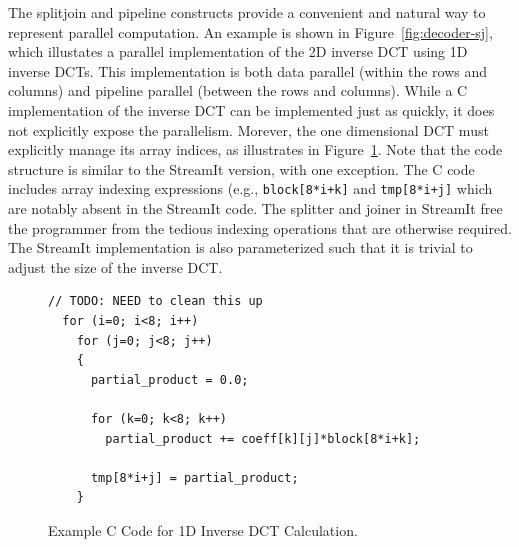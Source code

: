 The splitjoin and pipeline constructs provide a convenient and natural
way to represent parallel computation. An example is shown in
Figure~\ref{fig:decoder-sj}, which illustates a parallel
implementation of the 2D inverse DCT using 1D inverse DCTs. This
implementation is both data parallel (within the rows and columns) and
pipeline parallel (between the rows and columns). While a C
implementation of the inverse DCT can be implemented just as quickly,
it does not explicitly expose the parallelism. Morever, the one
dimensional DCT must explicitly manage its array indices, as
illustrates in Figure~\ref{fig:idct_creference}. Note that the code
structure is similar to the StreamIt version, with one exception. The
C code includes array indexing expressions (e.g.,
\texttt{block[8*i+k]} and \texttt{tmp[8*i+j]} which are notably absent
in the StreamIt code. The splitter and joiner in StreamIt free the
programmer from the tedious indexing operations that are otherwise
required. The StreamIt implementation is also parameterized such that
it is trivial to adjust the size of the inverse DCT.

\begin{figure}[t]
  \begin{scriptsize}
    \begin{verbatim}
// TODO: NEED to clean this up
  for (i=0; i<8; i++)
    for (j=0; j<8; j++)
    {
      partial_product = 0.0;

      for (k=0; k<8; k++)
        partial_product += coeff[k][j]*block[8*i+k];

      tmp[8*i+j] = partial_product;
    }
    \end{verbatim}
  \end{scriptsize}
  \vspace{-12pt}
  \caption{Example C Code for 1D Inverse DCT Calculation.}
  \label{fig:idct_creference}
\end{figure}


